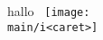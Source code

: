 \documentclass[11pt]{article}
\begin{document}
    hallo~\cite{goossens}
    \texttt{[image: \\main/i<caret>]}
    
    \printbibliography
\end{document}
